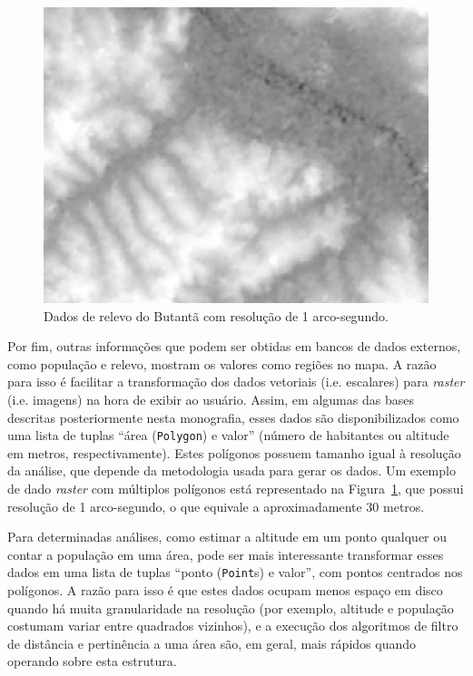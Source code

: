 \documentclass[]{politex}
\begin{document}
\begin{figure}[H]
    \centering
    \includegraphics[width=6in]{imagens/dados-relevo-30m}
    \caption{Dados de relevo do Butantã com resolução de 1 arco-segundo.}
    \label{fig:map_altitude_polygons}
\end{figure}

Por fim, outras informações que podem ser obtidas em bancos de dados externos,
como população e relevo, mostram os valores como regiões no mapa. A razão para
isso é facilitar a transformação dos dados vetoriais (i.e. escalares) para
\textit{raster} (i.e. imagens) na hora de exibir ao usuário. Assim, em algumas
das bases descritas posteriormente nesta monografia, esses dados são
disponibilizados como uma lista de tuplas ``área (\texttt{Polygon}) e valor''
(número de habitantes ou altitude em metros, respectivamente). Estes polígonos
possuem tamanho igual à resolução da análise, que depende da metodologia usada
para gerar os dados. Um exemplo de dado \textit{raster} com múltiplos polígonos
está representado na Figura~\ref{fig:map_altitude_polygons}, que possui
resolução de 1 arco-segundo, o que equivale a aproximadamente 30 metros.

Para determinadas análises, como estimar a altitude em um ponto qualquer ou
contar a população em uma área, pode ser mais interessante transformar esses
dados em uma lista de tuplas ``ponto (\texttt{Point}s) e valor'', com pontos
centrados nos polígonos. A razão para isso é que estes dados ocupam menos espaço
em disco quando há muita granularidade na resolução (por exemplo, altitude e
população costumam variar entre quadrados vizinhos), e a execução dos algoritmos
de filtro de distância e pertinência a uma área são, em geral, mais rápidos
quando operando sobre esta estrutura.
\end{document}
